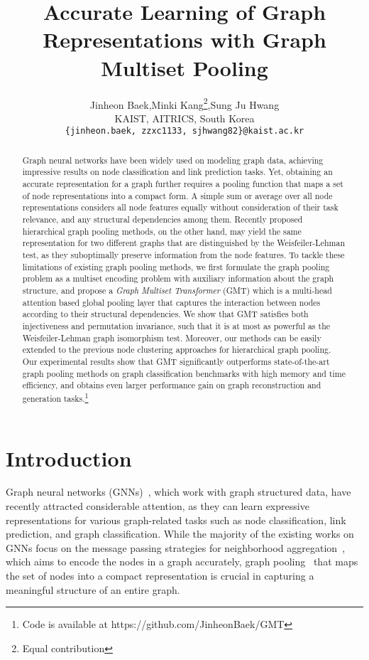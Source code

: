 \documentclass{article} \usepackage{iclr2021_conference,times}
\title{Accurate Learning of Graph Representations with Graph Multiset Pooling}
\author{Jinheon Baek,\quad Minki Kang\thanks{Equal contribution},\quad Sung Ju Hwang\\
    KAIST, AITRICS, South Korea \\
  \texttt{\{jinheon.baek, zzxc1133, sjhwang82\}@kaist.ac.kr} \\
}
\begin{document}
\maketitle

\begin{abstract}


Graph neural networks have been widely used on modeling graph data, achieving impressive results on node classification and link prediction tasks. Yet, obtaining an accurate representation for a graph further requires a pooling function that maps a set of node representations into a compact form. A simple sum or average over all node representations considers all node features equally without consideration of their task relevance, and any structural dependencies among them. Recently proposed hierarchical graph pooling methods, on the other hand, may yield the same representation for two different graphs that are distinguished by the Weisfeiler-Lehman test, as they suboptimally preserve information from the node features. To tackle these limitations of existing graph pooling methods, we first formulate the graph pooling problem as a multiset encoding problem with auxiliary information about the graph structure, and propose a \emph{Graph Multiset Transformer} (GMT) which is a multi-head attention based global pooling layer that captures the interaction between nodes according to their structural dependencies. We show that GMT satisfies both injectiveness and permutation invariance, such that it is at most as powerful as the Weisfeiler-Lehman graph isomorphism test. Moreover, our methods can be easily extended to the previous node clustering approaches for hierarchical graph pooling. Our experimental results show that GMT significantly outperforms state-of-the-art graph pooling methods on graph classification benchmarks with high memory and time efficiency, and obtains even larger performance gain on graph reconstruction and generation tasks.\footnote{Code is available at https://github.com/JinheonBaek/GMT}

\end{abstract}

\section{Introduction}

Graph neural networks (GNNs)~\citep{GNN/1, GNN/2}, which work with graph structured data, have recently attracted considerable attention, as they can learn expressive representations for various graph-related tasks such as node classification, link prediction, and graph classification. While the majority of the existing works on GNNs focus on the message passing strategies for neighborhood aggregation~\citep{GCN, GraphSAGE}, which aims to encode the nodes in a graph accurately, graph pooling~\citep{SortPool, DiffPool} that maps the set of nodes into a compact representation is crucial in capturing a meaningful structure of an entire graph.
\end{document}
